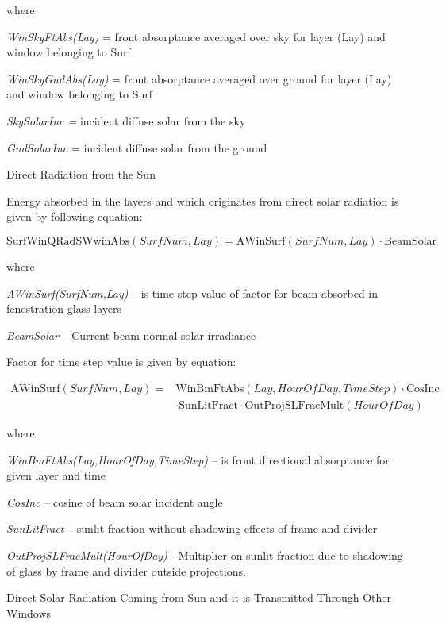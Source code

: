 where

\emph{WinSkyFtAbs(Lay)} = front absorptance averaged over sky for layer (Lay) and window belonging to Surf

\emph{WinSkyGndAbs(Lay)} = front absorptance averaged over ground for layer (Lay) and window belonging to Surf

\emph{SkySolarInc =} incident diffuse solar from the sky

\emph{GndSolarInc} = incident diffuse solar from the ground

Direct Radiation from the Sun

Energy absorbed in the layers and which originates from direct solar radiation is given by following equation:

\begin{equation}
\text{SurfWinQRadSWwinAbs}(SurfNum, Lay) = \text{AWinSurf}(SurfNum, Lay) \cdot \text{BeamSolar}
\end{equation}

where

\emph{AWinSurf(SurfNum,Lay)} -- is time step value of factor for beam absorbed in fenestration glass layers

\emph{BeamSolar} -- Current beam normal solar irradiance

Factor for time step value is given by equation:

\begin{equation}
\begin{split}
\text{AWinSurf}(SurfNum,Lay) =& \text{WinBmFtAbs}(Lay,HourOfDay,TimeStep) \cdot \text{CosInc} \\
&\cdot \text{SunLitFract} \cdot \text{OutProjSLFracMult}(HourOfDay)
\end{split}
\end{equation}

where

\emph{WinBmFtAbs(Lay,HourOfDay,TimeStep)} -- is front directional absorptance for given layer and time

\emph{CosInc} -- cosine of beam solar incident angle

\emph{SunLitFract} -- sunlit fraction without shadowing effects of frame and divider

\emph{OutProjSLFracMult(HourOfDay)} - Multiplier on sunlit fraction due to shadowing of glass by frame and divider outside projections.

Direct Solar Radiation Coming from Sun and it is Transmitted Through Other Windows

